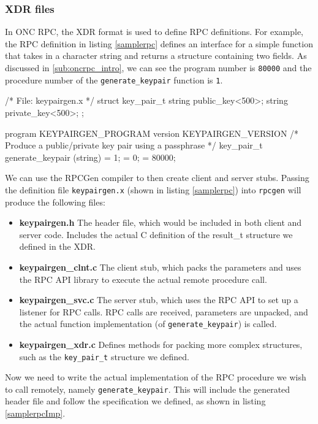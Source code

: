 \subsubsection{XDR files}
\label{sec:xdrsyntax}
In ONC RPC, the XDR format is used to define RPC definitions. For example, the RPC definition in listing \ref{samplerpc} defines an interface for a simple function that takes in a character string  and returns a structure containing two fields. As discussed in \ref{sub:oncrpc_intro}, we can see the program number is \lstinline+80000+ and the procedure number of the \lstinline+generate_keypair+ function is \lstinline+1+.

\begin{code}
/* File: keypairgen.x */
struct key_pair_t
{
  string  public_key<500>;
  string  private_key<500>;
};

program KEYPAIRGEN_PROGRAM
{
  version KEYPAIRGEN_VERSION
  {
    /* Produce a public/private key pair using a passphrase  */
    key_pair_t generate_keypair (string) = 1;
  } = 0;
} = 80000;
\end{code}

We can use the RPCGen compiler to then create client and server stubs. Passing the definition file \verb+keypairgen.x+ (shown in listing \ref{samplerpc}) into \lstinline+rpcgen+ will produce the following files:

\begin{itemize}
	\item \textbf{keypairgen.h} The header file, which would be included in both client and server code. Includes the actual C definition of the result\_t structure we defined in the XDR.
	\item \textbf{keypairgen\_clnt.c} The client stub, which packs the parameters and uses the RPC API library to execute the actual remote procedure call.
	\item \textbf{keypairgen\_svc.c} The server stub, which uses the RPC API to set up a listener for RPC calls. RPC calls are received, parameters are unpacked, and the actual function implementation (of \lstinline+generate_keypair+) is called.
	\item \textbf{keypairgen\_xdr.c} Defines methods for packing more complex structures, such as the \lstinline+key_pair_t+ structure we defined.
\end{itemize}

Now we need to write the actual implementation of the RPC procedure we wish to call remotely, namely \lstinline+generate_keypair+. This will include the generated header file and follow the specification we defined, as shown in listing \ref{samplerpcImp}. \\


